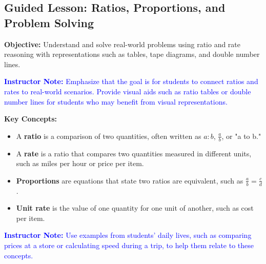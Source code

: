 \documentclass[12pt]{article}
\title{}
\date{}
\begin{document}
\subsection*{Guided Lesson: Ratios, Proportions, and Problem Solving}
\onehalfspacing

\begin{tcolorbox}[colframe=black!40, colback=gray!5, 
coltitle=black, colbacktitle=black!20, fonttitle=\bfseries\Large, 
title=Learning Objective, halign title=center, left=5pt, right=5pt, top=5pt, bottom=15pt]
\textbf{Objective:} Understand and solve real-world problems using ratio and rate reasoning with representations such as tables, tape diagrams, and double number lines.

\textcolor{blue}{\textbf{Instructor Note:} Emphasize that the goal is for students to connect ratios and rates to real-world scenarios. Provide visual aids such as ratio tables or double number lines for students who may benefit from visual representations.}
\end{tcolorbox}

\begin{tcolorbox}[colframe=black!60, colback=white, 
coltitle=black, colbacktitle=black!15, fonttitle=\bfseries\Large, 
title=Key Concepts and Vocabulary, halign title=center, left=10pt, right=10pt, top=10pt, bottom=15pt]
\textbf{Key Concepts:}
\begin{itemize}
    \item A \textbf{ratio} is a comparison of two quantities, often written as \( a:b \), \( \frac{a}{b} \), or "a to b."
    \item A \textbf{rate} is a ratio that compares two quantities measured in different units, such as miles per hour or price per item.
    \item \textbf{Proportions} are equations that state two ratios are equivalent, such as \( \frac{a}{b} = \frac{c}{d} \).
    \item \textbf{Unit rate} is the value of one quantity for one unit of another, such as cost per item.
\end{itemize}

\textcolor{blue}{\textbf{Instructor Note:} Use examples from students' daily lives, such as comparing prices at a store or calculating speed during a trip, to help them relate to these concepts.}
\end{tcolorbox}
\end{document}
